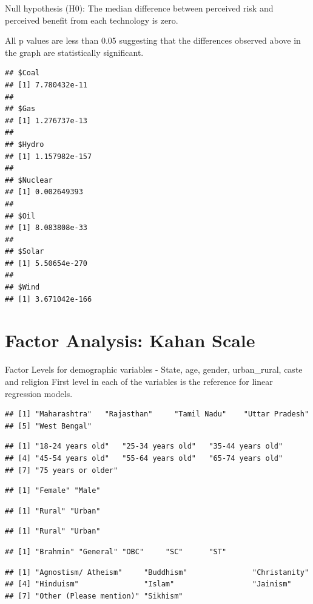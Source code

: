 \documentclass[
]{article}
\begin{document}
Null hypothesis (H0): The median difference between perceived risk and
perceived benefit from each technology is zero.

All p values are less than 0.05 suggesting that the differences observed
above in the graph are statistically significant.

\begin{verbatim}
## $Coal
## [1] 7.780432e-11
## 
## $Gas
## [1] 1.276737e-13
## 
## $Hydro
## [1] 1.157982e-157
## 
## $Nuclear
## [1] 0.002649393
## 
## $Oil
## [1] 8.083808e-33
## 
## $Solar
## [1] 5.50654e-270
## 
## $Wind
## [1] 3.671042e-166
\end{verbatim}

\newpage

\hypertarget{factor-analysis-kahan-scale}{%
\section{Factor Analysis: Kahan
Scale}\label{factor-analysis-kahan-scale}}

Factor Levels for demographic variables - State, age, gender,
urban\_rural, caste and religion First level in each of the variables is
the reference for linear regression models.

\begin{verbatim}
## [1] "Maharashtra"   "Rajasthan"     "Tamil Nadu"    "Uttar Pradesh"
## [5] "West Bengal"
\end{verbatim}

\begin{verbatim}
## [1] "18-24 years old"   "25-34 years old"   "35-44 years old"  
## [4] "45-54 years old"   "55-64 years old"   "65-74 years old"  
## [7] "75 years or older"
\end{verbatim}

\begin{verbatim}
## [1] "Female" "Male"
\end{verbatim}

\begin{verbatim}
## [1] "Rural" "Urban"
\end{verbatim}

\begin{verbatim}
## [1] "Rural" "Urban"
\end{verbatim}

\begin{verbatim}
## [1] "Brahmin" "General" "OBC"     "SC"      "ST"
\end{verbatim}

\begin{verbatim}
## [1] "Agnostism/ Atheism"     "Buddhism"               "Christanity"           
## [4] "Hinduism"               "Islam"                  "Jainism"               
## [7] "Other (Please mention)" "Sikhism"
\end{verbatim}
\end{document}
